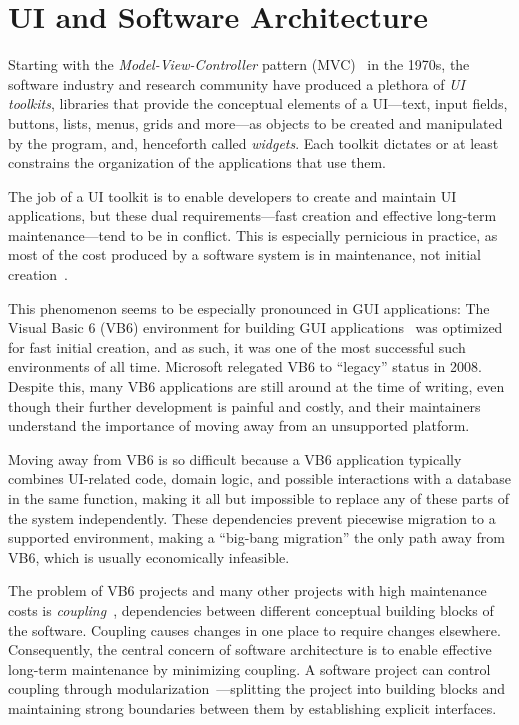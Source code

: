 \documentclass[sigplan,screen]{acmart}
\begin{document}
\section{UI and Software Architecture}
\label{sec:ui-and-architecture}

Starting with the \textit{Model-View-Controller} pattern
(MVC)~\cite{MVC} in the 1970s, the software
industry and research community have produced a plethora of \textit{UI
  toolkits}, libraries that provide the conceptual elements of a
UI---text, input fields, buttons, lists, menus, grids and more---as
objects to be created and manipulated by the program, and, henceforth
called \textit{widgets}.  Each toolkit dictates or at least
constrains the organization of the applications that use them.

The job of a UI toolkit is to enable developers to create and maintain
UI applications, but these dual requirements---fast creation and
effective long-term maintenance---tend to be in conflict.  This is especially pernicious in
practice, as most of the cost produced by a software system is in
maintenance, not initial creation~\cite{GreenBook}.

This phenomenon seems to be especially pronounced in GUI applications:
The Visual Basic 6 (VB6) environment for building GUI
applications~\cite{VB6} was optimized for fast initial creation, and
as such, it was one of the most successful such environments of all time.
Microsoft relegated VB6 to ``legacy'' status in 2008. Despite this,
many VB6 applications are still around at the time of writing, even
though their further development is painful and costly, and their
maintainers understand the importance of moving away from an
unsupported platform.

Moving away from VB6 is so difficult because a VB6 application
typically combines UI-related code, domain logic, and possible
interactions with a database in the same function, making it
all but impossible to replace any of these parts of the system
independently.  These dependencies prevent piecewise migration to a
supported environment, making a ``big-bang migration'' the only
path away from VB6, which is usually economically
infeasible.

The problem of VB6 projects and many other projects with
high maintenance costs is \textit{coupling}~\cite{GreenBook},
dependencies between different conceptual building blocks of the
software. Coupling causes changes in one place to require changes 
elsewhere.  Consequently, the central concern of software
architecture is to enable effective long-term maintenance by minimizing
coupling.  A software project can control coupling through 
{modularization}~\cite{Modularity}---splitting the
project into building blocks and maintaining strong boundaries between
them by establishing explicit interfaces.
\end{document}

